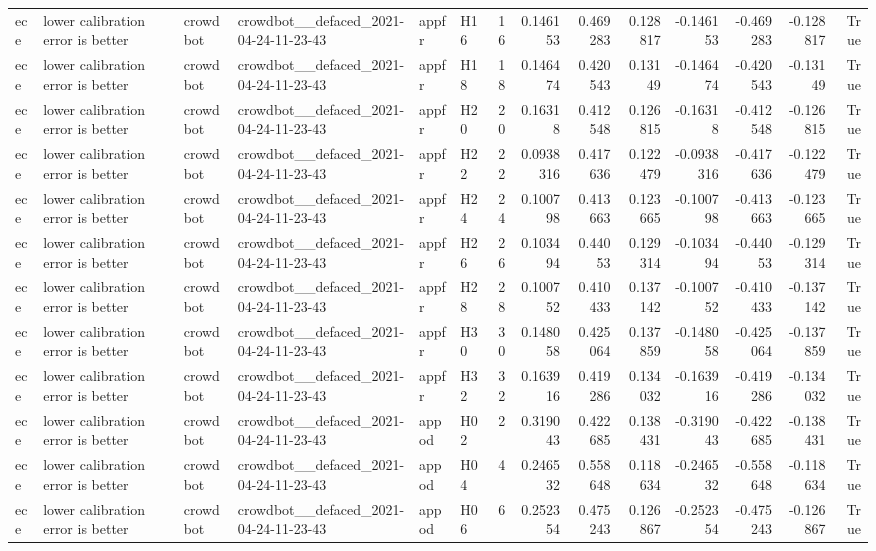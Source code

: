 \begin{longtable}{llllllrrrrrrrr}
ece & lower calibration error is better & crowdbot & crowdbot\_\_defaced\_2021-04-24-11-23-43 & appfr & H16 & 16 & 0.146153 & 0.469283 & 0.128817 & -0.146153 & -0.469283 & -0.128817 & True \\
ece & lower calibration error is better & crowdbot & crowdbot\_\_defaced\_2021-04-24-11-23-43 & appfr & H18 & 18 & 0.146474 & 0.420543 & 0.13149 & -0.146474 & -0.420543 & -0.13149 & True \\
ece & lower calibration error is better & crowdbot & crowdbot\_\_defaced\_2021-04-24-11-23-43 & appfr & H20 & 20 & 0.16318 & 0.412548 & 0.126815 & -0.16318 & -0.412548 & -0.126815 & True \\
ece & lower calibration error is better & crowdbot & crowdbot\_\_defaced\_2021-04-24-11-23-43 & appfr & H22 & 22 & 0.0938316 & 0.417636 & 0.122479 & -0.0938316 & -0.417636 & -0.122479 & True \\
ece & lower calibration error is better & crowdbot & crowdbot\_\_defaced\_2021-04-24-11-23-43 & appfr & H24 & 24 & 0.100798 & 0.413663 & 0.123665 & -0.100798 & -0.413663 & -0.123665 & True \\
ece & lower calibration error is better & crowdbot & crowdbot\_\_defaced\_2021-04-24-11-23-43 & appfr & H26 & 26 & 0.103494 & 0.44053 & 0.129314 & -0.103494 & -0.44053 & -0.129314 & True \\
ece & lower calibration error is better & crowdbot & crowdbot\_\_defaced\_2021-04-24-11-23-43 & appfr & H28 & 28 & 0.100752 & 0.410433 & 0.137142 & -0.100752 & -0.410433 & -0.137142 & True \\
ece & lower calibration error is better & crowdbot & crowdbot\_\_defaced\_2021-04-24-11-23-43 & appfr & H30 & 30 & 0.148058 & 0.425064 & 0.137859 & -0.148058 & -0.425064 & -0.137859 & True \\
ece & lower calibration error is better & crowdbot & crowdbot\_\_defaced\_2021-04-24-11-23-43 & appfr & H32 & 32 & 0.163916 & 0.419286 & 0.134032 & -0.163916 & -0.419286 & -0.134032 & True \\
ece & lower calibration error is better & crowdbot & crowdbot\_\_defaced\_2021-04-24-11-23-43 & appod & H02 & 2 & 0.319043 & 0.422685 & 0.138431 & -0.319043 & -0.422685 & -0.138431 & True \\
ece & lower calibration error is better & crowdbot & crowdbot\_\_defaced\_2021-04-24-11-23-43 & appod & H04 & 4 & 0.246532 & 0.558648 & 0.118634 & -0.246532 & -0.558648 & -0.118634 & True \\
ece & lower calibration error is better & crowdbot & crowdbot\_\_defaced\_2021-04-24-11-23-43 & appod & H06 & 6 & 0.252354 & 0.475243 & 0.126867 & -0.252354 & -0.475243 & -0.126867 & True \\

\end{longtable}
